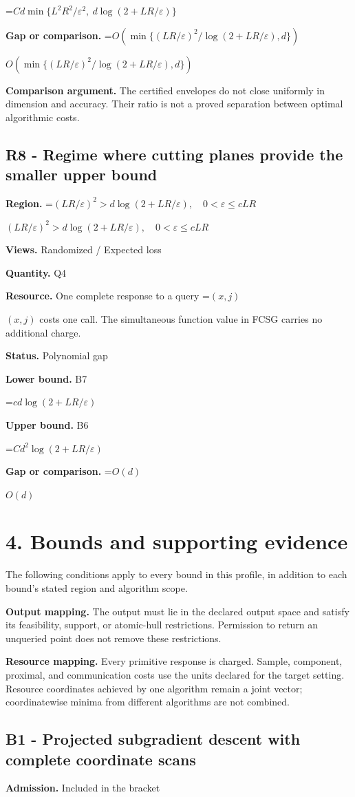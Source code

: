 \documentclass[10pt,a4paper]{article}
\newcommand{\AtlasMath}[1]{\par\begingroup\centering\setbox0=\hbox{$\displaystyle #1$}\ifdim\wd0>1.4\linewidth\typeout{ATLAS WIDE FORMULA: \the\wd0}\fi\ifdim\wd0>\linewidth\resizebox{\linewidth}{!}{\box0}\else\box0\fi\par\endgroup}
\newcommand{\AtlasInlineMath}[1]{\begingroup\setbox0=\hbox{$#1$}\ifdim\wd0>.4\linewidth\endgroup\AtlasMath{#1}\else\endgroup$#1$\fi}
\begin{document}
\AtlasMath{Cd\min\{L^2R^2/\varepsilon^2,\ d\log(2+LR/\varepsilon)\}}
\textbf{Gap or comparison.} \AtlasInlineMath{O\!\left(\min\{(LR/\varepsilon)^2/\log(2+LR/\varepsilon),d\}\right)}

\textbf{Comparison argument.} The certified envelopes do not close uniformly in dimension and accuracy. Their ratio is not a proved separation between optimal algorithmic costs.

\subsection{R8 - Regime where cutting planes provide the smaller upper bound}
\textbf{Region.} \AtlasInlineMath{(LR/\varepsilon)^2>d\log(2+LR/\varepsilon),\quad0<\varepsilon\le cLR}

\textbf{Views.} Randomized / Expected loss

\textbf{Quantity.} Q4

\textbf{Resource.} One complete response to a query \AtlasInlineMath{(x,j)} costs one call. The simultaneous function value in FCSG carries no additional charge.

\textbf{Status.} Polynomial gap

\textbf{Lower bound.} B7

\AtlasMath{cd\log(2+LR/\varepsilon)}
\textbf{Upper bound.} B6

\AtlasMath{Cd^2\log(2+LR/\varepsilon)}
\textbf{Gap or comparison.} \AtlasInlineMath{O(d)}

\section{4. Bounds and supporting evidence}
The following conditions apply to every bound in this profile, in addition to each bound's stated region and algorithm scope.

\textbf{Output mapping.} The output must lie in the declared output space and satisfy its feasibility, support, or atomic-hull restrictions. Permission to return an unqueried point does not remove these restrictions.

\textbf{Resource mapping.} Every primitive response is charged. Sample, component, proximal, and communication costs use the units declared for the target setting. Resource coordinates achieved by one algorithm remain a joint vector; coordinatewise minima from different algorithms are not combined.

\subsection{B1 - Projected subgradient descent with complete coordinate scans}
\textbf{Admission.} Included in the bracket
\end{document}
